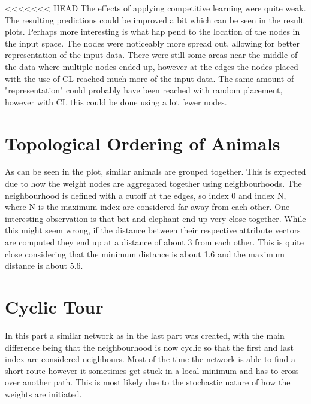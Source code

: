 \documentclass{article}
\begin{document}
<<<<<<< HEAD
The effects of applying competitive learning were quite weak. The resulting predictions could be improved a bit which can be seen in the result plots. Perhaps more interesting is what hap pend to the location of the nodes in the input space. The nodes were noticeably more spread out, allowing for better representation of the input data. There were still some areas near the middle of the data where multiple nodes ended up, however at the edges the nodes placed with the use of CL reached much more of the input data. The same amount of "representation" could probably have been reached with random placement, however with CL this could be done using a lot fewer nodes.

\FloatBarrier
\section{Topological Ordering of Animals}
As can be seen in the plot, similar animals are grouped together. This is expected due to how the weight nodes are aggregated together using neighbourhoods. The neighbourhood is defined with a cutoff at the edges, so index 0 and index N, where N is the maximum index are considered far away from each other. One interesting observation is that bat and elephant end up very close together. While this might seem wrong, if the distance between their respective attribute vectors are computed they end up at a distance of about 3 from each other. This is quite close considering that the minimum distance is about 1.6 and the maximum distance is about 5.6.


\section{Cyclic Tour}
In this part  a similar network as in the last part was created, with the main difference being that the neighbourhood is now cyclic so that the first and last index are considered neighbours. Most of the time the network is able to find a short route however it sometimes get stuck in a local minimum and has to cross over another path. This is most likely due to the stochastic nature of how the weights are initiated. 

\end{document}
